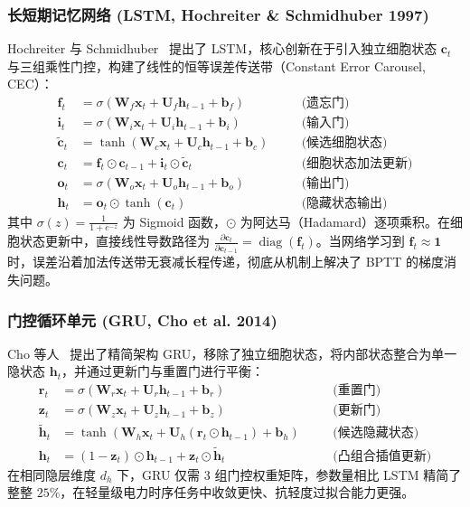 \subsubsection{长短期记忆网络 (LSTM, Hochreiter \& Schmidhuber 1997)}
Hochreiter 与 Schmidhuber~\cite{hochreiter1997long} 提出了 LSTM，核心创新在于引入独立细胞状态 $\mathbf{c}_t$ 与三组乘性门控，构建了线性的恒等误差传送带（Constant Error Carousel, CEC）：
\begin{align}
    \mathbf{f}_t &= \sigma(\mathbf{W}_f \mathbf{x}_t + \mathbf{U}_f \mathbf{h}_{t-1} + \mathbf{b}_f) \quad &&\text{(遗忘门)} \\
    \mathbf{i}_t &= \sigma(\mathbf{W}_i \mathbf{x}_t + \mathbf{U}_i \mathbf{h}_{t-1} + \mathbf{b}_i) \quad &&\text{(输入门)} \\
    \tilde{\mathbf{c}}_t &= \tanh(\mathbf{W}_c \mathbf{x}_t + \mathbf{U}_c \mathbf{h}_{t-1} + \mathbf{b}_c) \quad &&\text{(候选细胞状态)} \\
    \mathbf{c}_t &= \mathbf{f}_t \odot \mathbf{c}_{t-1} + \mathbf{i}_t \odot \tilde{\mathbf{c}}_t \quad &&\text{(细胞状态加法更新)} \\
    \mathbf{o}_t &= \sigma(\mathbf{W}_o \mathbf{x}_t + \mathbf{U}_o \mathbf{h}_{t-1} + \mathbf{b}_o) \quad &&\text{(输出门)} \\
    \mathbf{h}_t &= \mathbf{o}_t \odot \tanh(\mathbf{c}_t) \quad &&\text{(隐藏状态输出)}
\end{align}
其中 $\sigma(z) = \frac{1}{1 + e^{-z}}$ 为 Sigmoid 函数，$\odot$ 为阿达马（Hadamard）逐项乘积。在细胞状态更新中，直接线性导数路径为 $\frac{\partial \mathbf{c}_t}{\partial \mathbf{c}_{t-1}} = \operatorname{diag}(\mathbf{f}_t)$。当网络学习到 $\mathbf{f}_t \approx \mathbf{1}$ 时，误差沿着加法传送带无衰减长程传递，彻底从机制上解决了 BPTT 的梯度消失问题。

\subsubsection{门控循环单元 (GRU, Cho et al. 2014)}
Cho 等人~\cite{cho2014learning} 提出了精简架构 GRU，移除了独立细胞状态，将内部状态整合为单一隐状态 $\mathbf{h}_t$，并通过更新门与重置门进行平衡：
\begin{align}
    \mathbf{r}_t &= \sigma(\mathbf{W}_r \mathbf{x}_t + \mathbf{U}_r \mathbf{h}_{t-1} + \mathbf{b}_r) \quad &&\text{(重置门)} \\
    \mathbf{z}_t &= \sigma(\mathbf{W}_z \mathbf{x}_t + \mathbf{U}_z \mathbf{h}_{t-1} + \mathbf{b}_z) \quad &&\text{(更新门)} \\
    \tilde{\mathbf{h}}_t &= \tanh(\mathbf{W}_h \mathbf{x}_t + \mathbf{U}_h (\mathbf{r}_t \odot \mathbf{h}_{t-1}) + \mathbf{b}_h) \quad &&\text{(候选隐藏状态)} \\
    \mathbf{h}_t &= (1 - \mathbf{z}_t) \odot \mathbf{h}_{t-1} + \mathbf{z}_t \odot \tilde{\mathbf{h}}_t \quad &&\text{(凸组合插值更新)}
\end{align}
在相同隐层维度 $d_h$ 下，GRU 仅需 3 组门控权重矩阵，参数量相比 LSTM 精简了整整 $25\%$，在轻量级电力时序任务中收敛更快、抗轻度过拟合能力更强。

